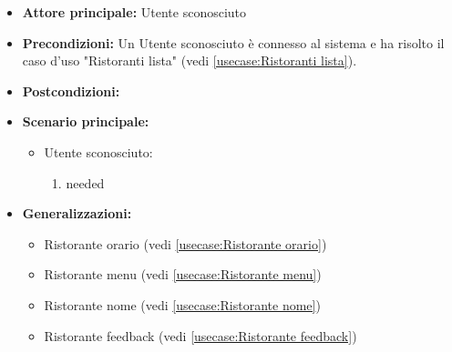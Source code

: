 \label{usecase:Ristorante dettaglio}
\begin{itemize}
\item \textbf{Attore principale:} Utente sconosciuto
\item \textbf{Precondizioni:}
Un Utente sconosciuto è connesso al sistema e ha risolto il caso d'uso "Ristoranti lista" (vedi \autoref{usecase:Ristoranti lista}).
\item \textbf{Postcondizioni:}
\item \textbf{Scenario principale:}
\begin{itemize}
\item Utente sconosciuto:
\begin{enumerate}
\item needed
\end{enumerate}
\end{itemize}
\item \textbf{Generalizzazioni:}
\begin{itemize}
\item Ristorante orario (vedi \autoref{usecase:Ristorante orario})\item Ristorante menu (vedi \autoref{usecase:Ristorante menu})\item Ristorante nome (vedi \autoref{usecase:Ristorante nome})\item Ristorante feedback (vedi \autoref{usecase:Ristorante feedback})
\end{itemize}
\end{itemize}